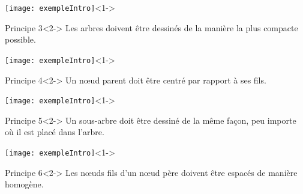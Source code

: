 \begin{frame}
	\begin{center}	
		\texttt{[image: exempleIntro]}<1->\\
		\begin{block}{Principe 3}<2->
		Les arbres doivent être dessinés de la manière la plus compacte possible.
		\end{block}
	\end{center}
\end{frame}

\begin{frame}
	\begin{center}	
		\texttt{[image: exempleIntro]}<1->\\
		\begin{block}{Principe 4}<2->
		Un n\oe{}ud parent doit être centré par rapport à ses fils.
		\end{block}
	\end{center}
\end{frame}

\begin{frame}
	\begin{center}	
		\texttt{[image: exempleIntro]}<1->\\
		\begin{block}{Principe 5}<2->
		Un sous-arbre doit être dessiné de la même façon, peu importe où il est placé dans l'arbre.
		\end{block}
	\end{center}
\end{frame}

\begin{frame}
	\begin{center}	
		\texttt{[image: exempleIntro]}<1->\\
		\begin{block}{Principe 6}<2->
		Les n\oe{}uds fils d'un n\oe{}ud père doivent être espacés de manière homogène.
		\end{block}
	\end{center}
\end{frame}

